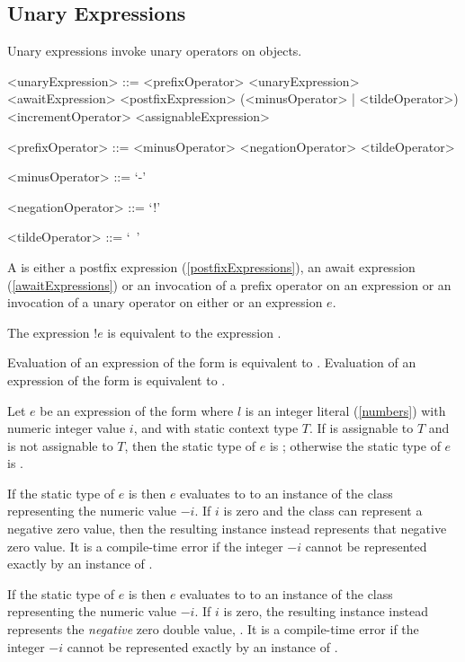 \documentclass[makeidx]{article}
\begin{document}
{\subsection{Unary Expressions}

\LMHash{}%
Unary expressions invoke unary operators on objects.

\begin{grammar}
<unaryExpression> ::= <prefixOperator> <unaryExpression>
  \alt <awaitExpression>
  \alt <postfixExpression>
  \alt (<minusOperator> | <tildeOperator>) \SUPER{}
  \alt <incrementOperator> <assignableExpression>

<prefixOperator> ::= <minusOperator>
  \alt <negationOperator>
  \alt <tildeOperator>

<minusOperator> ::= `-'

<negationOperator> ::= `!'

<tildeOperator> ::= `~'
\end{grammar}

\LMHash{}%
A  is either a postfix expression (\ref{postfixExpressions}), an await expression (\ref{awaitExpressions}) or an invocation of a prefix operator on an expression or an invocation of a unary operator on either \SUPER{} or an expression $e$.

\LMHash{}%
The expression $!e$ is equivalent to the expression .

\LMHash{}%
Evaluation of an expression of the form  is equivalent to .
Evaluation of an expression of the form  is equivalent to .

\LMHash{}%
Let $e$ be an expression of the form 
where $l$ is an integer literal (\ref{numbers}) with numeric integer value $i$,
and with static context type $T$.
If  is assignable to $T$ and  is not assignable to $T$,
then the static type of $e$ is ;
otherwise the static type of $e$ is .

\LMHash{}%
If the static type of $e$ is  then $e$ evaluates to
to an instance of the  class representing the numeric value $-i$.
If $i$ is zero and the  class can represent a negative zero value,
then the resulting instance instead represents that negative zero value.
It is a compile-time error if the integer $-i$ cannot be represented
exactly by an instance of .

\LMHash{}%
If the static type of $e$ is  then $e$ evaluates to
to an instance of the  class representing the numeric value $-i$.
If $i$ is zero, the resulting instance instead represents the
\emph{negative} zero double value, .
It is a compile-time error if the integer $-i$ cannot be represented
exactly by an instance of .

}
\end{document}
